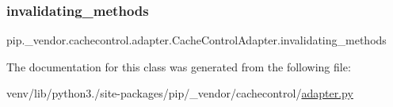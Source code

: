 \subsubsection{\texorpdfstring{invalidating\+\_\+methods}{invalidating\_methods}}
{\footnotesize\ttfamily pip.\+\_\+vendor.\+cachecontrol.\+adapter.\+Cache\+Control\+Adapter.\+invalidating\+\_\+methods\hspace{0.3cm}{\ttfamily [static]}}



The documentation for this class was generated from the following file\+:\begin{DoxyCompactItemize}
\item 
venv/lib/python3./site-\/packages/pip/\+\_\+vendor/cachecontrol/\hyperlink{adapter_8py}{adapter.\+py}\end{DoxyCompactItemize}
